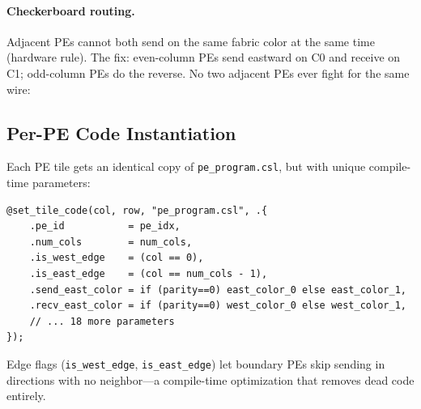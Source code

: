 \documentclass[11pt,letterpaper]{article}
\begin{document}
\paragraph{Checkerboard routing.} Adjacent PEs cannot both send on the same fabric color at the same time (hardware rule). The fix: even-column PEs send eastward on C0 and receive on C1; odd-column PEs do the reverse. No two adjacent PEs ever fight for the same wire:

\begin{center}
\end{center}

\subsection{Per-PE Code Instantiation}

Each PE tile gets an identical copy of \texttt{pe\_program.csl}, but with unique compile-time parameters:

\begin{lstlisting}[language=CSL, caption={PE instantiation in \texttt{layout.csl} (simplified)}, label=lst:tile]
@set_tile_code(col, row, "pe_program.csl", .{
    .pe_id           = pe_idx,
    .num_cols        = num_cols,
    .is_west_edge    = (col == 0),
    .is_east_edge    = (col == num_cols - 1),
    .send_east_color = if (parity==0) east_color_0 else east_color_1,
    .recv_east_color = if (parity==0) west_color_0 else west_color_1,
    // ... 18 more parameters
});
\end{lstlisting}

Edge flags (\texttt{is\_west\_edge}, \texttt{is\_east\_edge}) let boundary PEs skip sending in directions with no neighbor---a compile-time optimization that removes dead code entirely.
\end{document}
